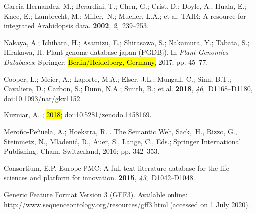 \documentclass[applsci,article,accept,moreauthors,pdftex]{Definitions/mdpi}
\begin{document}
{\begin{thebibliography}{999}
{
Garcia-Hernandez, M.; Berardini, T.; Chen, G.; Crist, D.; Doyle, A.; Huala, E.;
  Knee, E.; Lambrecht, M.; Miller,~N.; Mueller, L.A.; et al.
\newblock TAIR: A resource for integrated Arabidopsis data.
 {\bf 2002}, {\em
  2},~239--253.

Nakaya, A.; Ichihara, H.; Asamizu, E.; Shirasawa, S.; Nakamura, Y.; Tabata, S.;
  Hirakawa, H.
\newblock Plant genome database japan (PGDBj). In {\em Plant Genomics
  Databases}; Springer:  \hl{Berlin/Heidelberg, Germany,} %
 2017; pp. 45--77.

Cooper, L.; Meier, A.; Laporte, M.A.; Elser, J.L.; Mungall, C.; Sinn, B.T.;
  Cavaliere, D.; Carbon, S.; Dunn, N.A.; Smith, B.; et al.
 {\bf 2018}, {\em 46},~D1168--D1180, doi:10.1093/nar/gkx1152.

Kuzniar, A.
;  \hl{2018;} %
 doi:10.5281/zenodo.1458169.

Mero{\~{n}}o-Pe{\~{n}}uela, A.; Hoekstra, R.
.
\newblock  The Semantic Web, Sack,~H., Rizzo, G., Steinmetz, N.,
  Mladeni{\'{c}}, D., Auer, S., Lange, C., Eds.; Springer International
  Publishing: Cham, Switzerland, 2016; pp. 342--353.

Consortium, E.P.
\newblock Europe PMC: A full-text literature database for the life sciences and
  platform for innovation.
 {\bf 2015}, {\em 43},~D1042--D1048.

Generic Feature Format Version 3 (GFF3).
\newblock Available online: \url{http://www.sequenceontology.org/resources/gff3.html}
\newblock  (accessed on 1 July 2020).

}
\end{thebibliography}}
\end{document}
